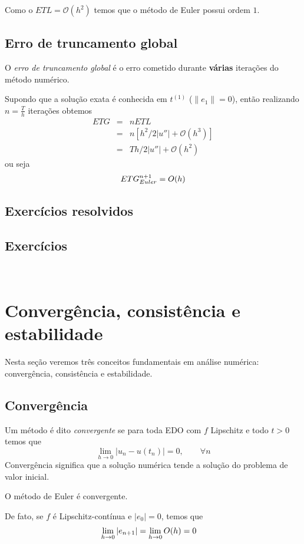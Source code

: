 Como o $ETL=\mathcal O(h^2)$ temos que o método de Euler possui ordem $1$.


\subsection{Erro de truncamento global}
O \emph{erro de truncamento global} é o erro cometido durante \textbf{várias} iterações do método numérico.

Supondo que a solução exata é conhecida em $t^{(1)}$ ($\|e_1\|=0$), então realizando $n=\frac{T}{h}$ iterações obtemos
\begin{eqnarray}
   ETG &=& nETL \\
       &=& n[h^2/2|u''|+ \mathcal O(h^3)] \\
       &=& Th/2|u''|+ \mathcal O(h^2)
\end{eqnarray}
ou seja
$$ETG_{Euler}^{n+1} = \mathcal \mathcal{O}(h)$$

\subsection*{Exercícios resolvidos}

\emconstrucao

\subsection*{Exercícios}
\

\section{Convergência, consistência e estabilidade}
Nesta seção veremos três conceitos fundamentais em análise numérica: convergência, consistência e estabilidade.

\subsection{Convergência}
Um método é dito \emph{convergente} se para toda EDO com $f$ Lipschitz e todo $t>0$ temos que
$$ \lim_{h \rightarrow 0} |u_n - u(t_n)| =0, \quad \quad \forall n$$
Convergência significa que a solução numérica tende a solução do problema de valor inicial.


\begin{teo}
O método de Euler é convergente.
\end{teo}

De fato, se $f$ é Lipschitz-contínua e $|e_0|=0$, temos que
\begin{eqnarray}
 \lim_{h\rightarrow 0} |e_{n+1}|  &= \lim_{h\rightarrow 0} \mathcal \mathcal{O}(h) = 0
\end{eqnarray}


